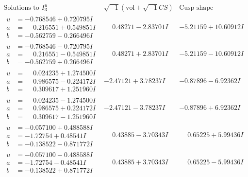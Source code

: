 \documentclass[1p]{elsarticle_modified}
\theoremstyle{definition}
\newcommand{\I}{\sqrt{-1}}
\begin{document}
$$\begin{array}{c|c|c}  
\text{Solutions to }I^u_{3}& \I (\text{vol} + \sqrt{-1}CS) & \text{Cusp shape}\\
 \hline 
\begin{aligned}
u &= -0.768546 + 0.720795 I \\
a &= \phantom{-}0.216551 + 0.549851 I \\
b &= -0.562759 - 0.266496 I\end{aligned}
 & \phantom{-}0.48271 - 2.83701 I & -5.21159 + 10.60912 I \\ \hline\begin{aligned}
u &= -0.768546 - 0.720795 I \\
a &= \phantom{-}0.216551 - 0.549851 I \\
b &= -0.562759 + 0.266496 I\end{aligned}
 & \phantom{-}0.48271 + 2.83701 I & -5.21159 - 10.60912 I \\ \hline\begin{aligned}
u &= \phantom{-}0.024235 + 1.274500 I \\
a &= \phantom{-}0.986575 - 0.224172 I \\
b &= \phantom{-}0.309617 + 1.251960 I\end{aligned}
 & -2.47121 + 3.78237 I & -0.87896 - 6.92362 I \\ \hline\begin{aligned}
u &= \phantom{-}0.024235 - 1.274500 I \\
a &= \phantom{-}0.986575 + 0.224172 I \\
b &= \phantom{-}0.309617 - 1.251960 I\end{aligned}
 & -2.47121 - 3.78237 I & -0.87896 + 6.92362 I \\ \hline\begin{aligned}
u &= -0.057100 + 0.488588 I \\
a &= -1.72754 + 0.48541 I \\
b &= -0.138522 - 0.871772 I\end{aligned}
 & \phantom{-}0.43885 - 3.70343 I & \phantom{-}0.65225 + 5.99436 I \\ \hline\begin{aligned}
u &= -0.057100 - 0.488588 I \\
a &= -1.72754 - 0.48541 I \\
b &= -0.138522 + 0.871772 I\end{aligned}
 & \phantom{-}0.43885 + 3.70343 I & \phantom{-}0.65225 - 5.99436 I \\ \hline\begin{aligned}

\end{aligned}
\end{array}$$
\end{document}

